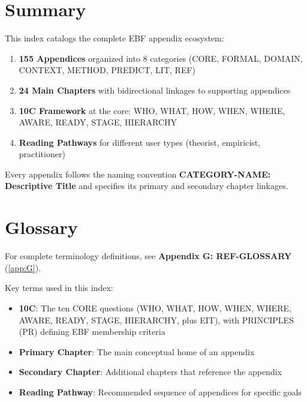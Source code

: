 \section{Summary}
\label{sec:index-summary}

\begin{tcolorbox}[colback=gray!5!white, colframe=gray!75!black,
    title=Summary: The EBF Appendix System]

This index catalogs the complete EBF appendix ecosystem:

\begin{enumerate}[nosep]
\item \textbf{155 Appendices} organized into 8 categories (CORE, FORMAL, DOMAIN, CONTEXT, METHOD, PREDICT, LIT, REF)
\item \textbf{24 Main Chapters} with bidirectional linkages to supporting appendices
\item \textbf{10C Framework} at the core: WHO, WHAT, HOW, WHEN, WHERE, AWARE, READY, STAGE, HIERARCHY
\item \textbf{Reading Pathways} for different user types (theorist, empiricist, practitioner)
\end{enumerate}

Every appendix follows the naming convention \textbf{CATEGORY-NAME: Descriptive Title} and specifies its primary and secondary chapter linkages.

\end{tcolorbox}

\section{Glossary}
\label{sec:index-glossary}

For complete terminology definitions, see \textbf{Appendix G: REF-GLOSSARY} (\ref{app:G}).

Key terms used in this index:
\begin{itemize}[nosep]
\item \textbf{10C}: The ten CORE questions (WHO, WHAT, HOW, WHEN, WHERE, AWARE, READY, STAGE, HIERARCHY, plus EIT), with PRINCIPLES (PR) defining EBF membership criteria
\item \textbf{Primary Chapter}: The main conceptual home of an appendix
\item \textbf{Secondary Chapter}: Additional chapters that reference the appendix
\item \textbf{Reading Pathway}: Recommended sequence of appendices for specific goals
\end{itemize}

